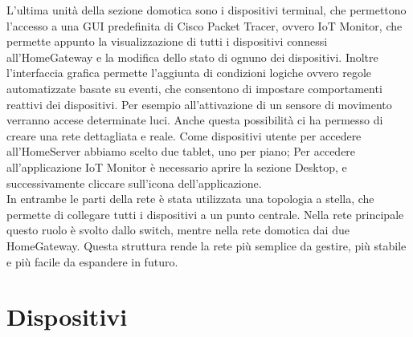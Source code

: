 \documentclass[italian, 12pt, a4paper]{article}
\begin{document}
L'ultima unità della sezione domotica sono i dispositivi terminal, che permettono l'accesso a una GUI predefinita di Cisco Packet Tracer, ovvero IoT Monitor, che permette appunto la visualizzazione di tutti i dispositivi connessi all'HomeGateway e la modifica dello stato di ognuno dei dispositivi. Inoltre l'interfaccia grafica permette l'aggiunta di condizioni logiche ovvero regole automatizzate basate su eventi, che consentono di impostare comportamenti reattivi dei dispositivi. Per esempio all'attivazione di un sensore di movimento verranno accese determinate luci. Anche questa possibilità ci ha permesso di creare una rete dettagliata e reale. Come dispositivi utente per accedere all'HomeServer abbiamo scelto due tablet, uno per piano; Per accedere all'applicazione IoT Monitor è necessario aprire la sezione Desktop, e successivamente cliccare sull'icona dell'applicazione.\\In entrambe le parti della rete è stata utilizzata una topologia a stella, che permette di collegare tutti i dispositivi a un punto centrale. Nella rete principale questo ruolo è svolto dallo switch, mentre nella rete domotica dai due HomeGateway. Questa struttura rende la rete più semplice da gestire, più stabile e più facile da espandere in futuro.
\clearpage

\section{Dispositivi}\label{sec:dispositivi}
\end{document}
